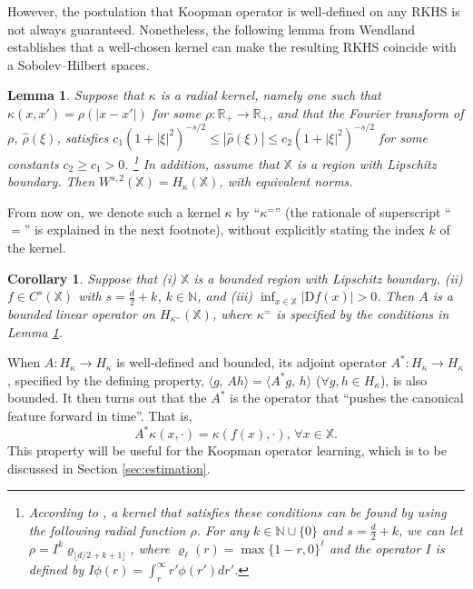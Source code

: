 \documentclass[english]{cccconf}
\renewcommand{\emph}[1]{\textit{#1}}
\newtheorem{lemma}{Lemma}
\newtheorem{corollary}{Corollary}
\newcommand{\mr}[1]{\mathrm{#1}}
\newcommand{\mbb}[1]{\mathds{#1}} %
\newcommand{\mR}{\mbb{R}}
\newcommand{\ip}[2]{\langle #1, \, #2 \rangle}
\begin{document}
\par However, the postulation that Koopman operator is well-defined on any RKHS is not always guaranteed. Nonetheless, the following lemma from Wendland \cite{wendland2004scattered} establishes that a well-chosen kernel can make the resulting RKHS coincide with a Sobolev--Hilbert spaces. 
\begin{lemma}\label{lem:Sobolev-RKHS}
    Suppose that $\kappa$ is a \emph{radial kernel}, namely one such that $\kappa(x, x') = \rho(|x-x'|)$ for some $\rho: \mR_+\rightarrow \mR_+$, and that the Fourier transform of $\rho$, $\hat{\rho}(\xi)$, satisfies $c_1(1+|\xi|^2)^{-s/2}\leq |\hat{\rho}(\xi)| \leq c_2(1+|\xi|^2)^{-s/2}$ for some constants $c_2\geq c_1>0$.
    \footnote{According to \cite{wendland2004scattered}, a kernel that satisfies these conditions can be found by using the following radial function $\rho$. 
    For any $k\in \mbb{N}\cup\{0\}$ and $s=\frac{d}{2}+k$, we can let $\rho = I^k \varrho_{\lfloor d/2+k+1 \rfloor}$, 
    where $\varrho_\ell(r) = \max\{1-r, 0\}^\ell$ and the operator $I$ is defined by $I\phi(r) = \int_r^\infty r'\phi(r')dr'$.}
    In addition, assume that $\mbb{X}$ is a region with Lipschitz boundary. Then $W^{s,2}(\mbb{X})=H_\kappa(\mbb{X})$, with equivalent norms. 
\end{lemma}

From now on, we denote such a kernel $\kappa$ by ``$\kappa^=$'' (the rationale of superscript ``$=$'' is explained in the next footnote), without explicitly stating the index $k$ of the kernel. 
\begin{corollary}\label{cor:Wendland}
    Suppose that (i) $\mbb{X}$ is a bounded region with Lipschitz boundary, (ii) $f\in C^s(\mbb{X})$ with $s=\frac{d}{2}+k$, $k\in \mbb{N}$, and (iii) $\inf_{x\in \mbb{X}} \lvert \mr{D}f(x) \rvert > 0$. Then $A$ is a bounded linear operator on $H_{\kappa^=}(\mbb{X})$, where $\kappa^=$ is specified by the conditions in Lemma \ref{lem:Sobolev-RKHS}. 
\end{corollary}

\par When $A: H_\kappa\rightarrow H_\kappa$ is well-defined and bounded, its adjoint operator $A^\ast: H_\kappa\rightarrow H_\kappa$, specified by the defining property, $\ip{g}{Ah} = \ip{A^\ast g}{h}$ ($\forall g, h\in H_\kappa$), is also bounded. It then turns out that the $A^\ast$ is the operator that ``pushes the canonical feature forward in time''. That is, 
\begin{equation}\label{eq:push-forward}
  A^\ast \kappa(x, \cdot) = \kappa(f(x), \cdot), \, \forall x\in \mbb{X}.  
\end{equation}
This property will be useful for the Koopman operator learning, which is to be discussed in Section \ref{sec:estimation}. 
\end{document}
